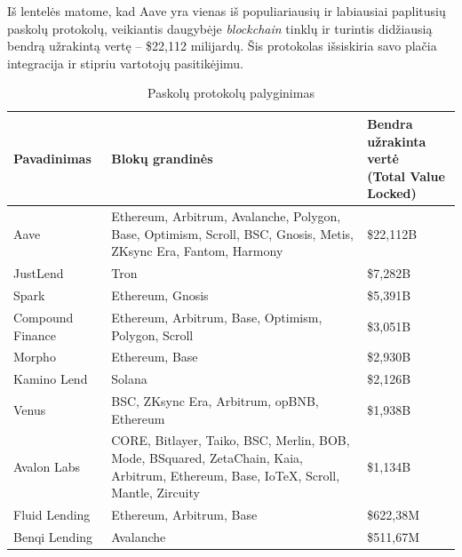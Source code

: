 \documentclass[]{VUMIFTemplateClass}
\begin{document}
Iš lentelės matome, kad Aave yra vienas iš populiariausių ir labiausiai paplitusių paskolų protokolų, veikiantis daugybėje \textit{blockchain} tinklų ir turintis didžiausią bendrą užrakintą vertę – \$22,112 milijardų. Šis protokolas išsiskiria savo plačia integracija ir stipriu vartotojų pasitikėjimu.


\begin{table}[H]
  \centering
  \caption{Paskolų protokolų palyginimas \cite{LikvidacijuProtokolai}}
  \begin{tabular}{|l|p{7cm}|p{5cm}|}
  \hline
  \textbf{Pavadinimas}       & \textbf{Blokų grandinės}                                                                 & \makecell{\textbf{Bendra užrakinta vertė} \\ \textbf{(Total Value Locked)}} \\ \hline
  Aave                      & Ethereum, Arbitrum, Avalanche, Polygon, Base, Optimism, Scroll, BSC, Gnosis, Metis, ZKsync Era, Fantom, Harmony & \$22,112B \\ \hline
  JustLend                  & Tron                                                                                  & \$7,282B  \\ \hline
  Spark                     & Ethereum, Gnosis                                                                      & \$5,391B  \\ \hline
  Compound Finance          & Ethereum, Arbitrum, Base, Optimism, Polygon, Scroll                                   & \$3,051B  \\ \hline
  Morpho                    & Ethereum, Base                                                                        & \$2,930B  \\ \hline
  Kamino Lend               & Solana                                                                                & \$2,126B  \\ \hline
  Venus                     & BSC, ZKsync Era, Arbitrum, opBNB, Ethereum                                            & \$1,938B  \\ \hline
  Avalon Labs               & CORE, Bitlayer, Taiko, BSC, Merlin, BOB, Mode, BSquared, ZetaChain, Kaia, Arbitrum, Ethereum, Base, IoTeX, Scroll, Mantle, Zircuity & \$1,134B  \\ \hline
  Fluid Lending             & Ethereum, Arbitrum, Base                                                              & \$622,38M \\ \hline
  Benqi Lending             & Avalanche                                                                             & \$511,67M \\ \hline

\end{tabular}
\end{table}
\end{document}
